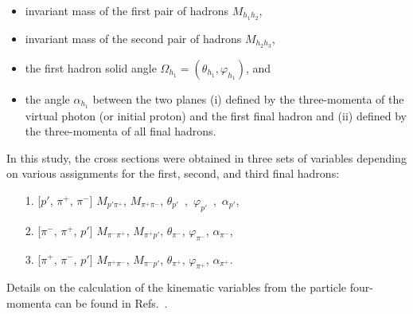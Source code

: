 \documentclass[prc,twocolumn,superscriptaddress,showpacs,amssymb,amsmath,amsfonts,aps,nofootinbib]{revtex4-1}
\begin{document}
\begin{itemize}
\item invariant mass of the first pair of hadrons $M_{h_{1}h_{2}}$,\vspace{-0.4em}
\item invariant mass of the second pair of hadrons $M_{h_{2}h_{3}}$,\vspace{-0.4em}
\item the first hadron solid angle $\Omega_{h_{1}}\! \!=\! (\theta_{h_{1}}, \varphi_{h_{1}})$, and\vspace{-0.4em}
\item the angle $\alpha_{h_{1}}$ between the two planes (i) defined by the three-momenta of the virtual photon (or initial proton) and the first final hadron and (ii) defined by the three-momenta of all final hadrons.\vspace{-0.25em}
\end{itemize}

In this study, the cross sections were obtained in three sets of variables depending on various assignments for the first, second, and third final hadrons:\vspace{-0.25em}
\begin{itemize}
\item[1.] [$p'$, $\pi^{+}$, $\pi^{-}$]
$M_{p'\pi^{+}}$, $M_{\pi^{+}\pi^{-}}$, $\theta_{p'}$~,~$\varphi_{p'}$~,~$\alpha_{p'}$,\vspace{-0.4em}
\item[2.] [$\pi^{-}$, $\pi^{+}$, $p'$]
$M_{\pi^{-}\pi^{+}}$, $M_{\pi^{+}p'}$, $\theta_{\pi^{-}}$, $\varphi_{\pi^{-}}$, $\alpha_{\pi^{-}}$,~\vspace{-0.4em}
\item[3.]  [$\pi^{+}$, $\pi^{-}$, $p'$]
$M_{\pi^{+}\pi^{-}}$, $M_{\pi^{-}p'}$, $\theta_{\pi^{+}}$, $\varphi_{\pi^{+}}$, $\alpha_{\pi^{+}}$.\vspace{-0.25em}
\end{itemize}


Details on the calculation of the kinematic variables from the particle four-momenta can be found in Refs.\!~\cite{my_an_note:2020, my_thesis:2021,Fed_an_note:2017,Fedotov:2008aa}.
\end{document}
